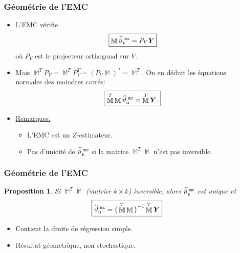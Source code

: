 \documentclass{beamer}
\newtheorem{prop}[theo]{Proposition}
\DeclareMathOperator{\estMC}{\widehat \vartheta_n^{\,\,{\tt mc}}}
\DeclareMathOperator{\design}{\mathbb{M}}
\begin{document}
 \begin{frame}
\frametitle{Géométrie de l'EMC}
 \begin{itemize}
 \item L'EMC vérifie
$$\boxed{\design {\estMC} = P_V \boldsymbol{Y}}$$
o\`u $P_V$ est le projecteur orthogonal sur $V$.
\item Mais $\design^T  P_V= \design^T  P_V^T = ( P_V\design)^T =
\design^T$. On en déduit \alert{les équations normales des
moindres carrés}:
$$\boxed{\design^T\design {\estMC} =
\design^T\boldsymbol{Y}.}$$
\item \underline{Remarques.}
  \begin{itemize}
  \item L'EMC est un $Z$-estimateur.
  \item Pas d'\alert{unicité} de $\estMC$ si la matrice
  $\design^T\design$ n'est pas inversible.
  \end{itemize}
\end{itemize}
\end{frame}

\begin{frame} \frametitle{Géométrie de l'EMC}
\begin{prop}
Si $\design^T\design$ (matrice $k \times k$) inversible, alors
$\estMC$ \alert{est unique} et
$$\boxed{\estMC = \big(\design^T\design\big)^{-1}\design^T \boldsymbol{Y}}$$
\end{prop}
\begin{itemize}
\item Contient  la droite de régression simple.
\item Résultat géometrique, \alert{non stochastique}.
\end{itemize}
\end{frame}














\end{document}
